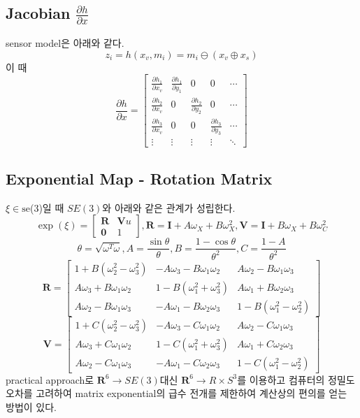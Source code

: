 \documentclass[master,korean,final]{cbnu-ecs}
\begin{document}
\subsection{Jacobian $\frac{\partial h}{\partial x} $}
sensor model은 아래와 같다.
\[
z_i=h(x_v, m_i)=m_i\ominus(x_v\oplus x_s)
\]
이 때 
\[
\frac{\partial h}{\partial x} =
\begin{bmatrix}
\frac{\partial h_1}{\partial x_v} & \frac{\partial h_1}{\partial y_1} & 0 & 0&\cdots\\
\frac{\partial h_2}{\partial x_v} & 0 & \frac{\partial h_2}{\partial y_2} & 0&\cdots\\
\frac{\partial h_3}{\partial x_v} & 0 & 0 &  \frac{\partial h_3}{\partial y_3}&\cdots\\
\vdots&\vdots&\vdots&\vdots&\ddots
\end{bmatrix}
\]

\subsection{Exponential Map - Rotation Matrix}
$\xi\in\textrm{se}$(3)일 때
$SE(3)$와 아래와 같은 관계가 성립한다. 
\[
\exp(\xi) = \begin{bmatrix} \textbf{R} & \textbf{V}u \\ \textbf{0} & 1 \end{bmatrix}, 
\textbf{R} = \textbf{I} + A\omega_X + B\omega_X^2, \textbf{V}=\textbf{I} + B\omega_X + B\omega_C^2\]
\[
\theta=\sqrt{\omega^T\omega}, A = \frac{\sin\theta}{\theta}, B=\frac{1-\cos\theta}{\theta^2}, C=\frac{1-A}{\theta^2}
\]
\[
\textbf{R} = 
\begin{bmatrix}
 1+B(\omega_2^2-\omega_3^2)	&  -A\omega_3 -B\omega_1\omega_2	& A\omega_2 - B\omega_1\omega_3 \\
 A\omega_3+B\omega_1\omega_2	& 1-B(\omega_1^2+\omega_3^2)		& A\omega_1 + B\omega_2\omega_3 \\
A \omega_2-B\omega_1\omega_3	& -A\omega_1 - B\omega_2\omega_3	& 1-B(\omega_1^2-\omega_2^2)
 \end{bmatrix}
\]
\[
\textbf{V} = 
\begin{bmatrix}
 1+C(\omega_2^2-\omega_3^2)	&  -A\omega_3 -C\omega_1\omega_2	& A\omega_2 - C\omega_1\omega_3 \\
 A\omega_3+C\omega_1\omega_2	& 1-C(\omega_1^2+\omega_3^2)		& A\omega_1 + C\omega_2\omega_3 \\
A \omega_2-C\omega_1\omega_3	& -A\omega_1 - C\omega_2\omega_3	& 1-C(\omega_1^2-\omega_2^2)
 \end{bmatrix}
\]
practical approach로 $\mathbf{R}^6\rightarrow SE(3)$대신 $\mathbf{R}^6\rightarrow R\times S^3$를 이용하고 컴퓨터의 정밀도 오차를 고려하여 matrix exponential의 급수 전개를 제한하여 계산상의 편의를 얻는 방법이 있다.
\end{document}
